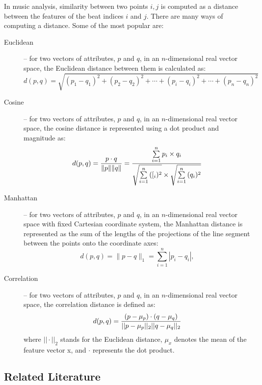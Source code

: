 In music analysis, similarity between two points $i, j$ is computed as a distance between the features of the beat indices $i$ and $j$. There are many ways of computing a distance. Some of the most popular are:
\begin{description}
\item[Euclidean] --  for two vectors of attributes, $p$ and $q$, in an $n$-dimensional real vector space, the Euclidean distance between them is calculated as:
\begin{equation}
d(p, q) = \sqrt{(p_1- q_1)^2 + (p_2 - q_2)^2+\cdots+(p_i - q_i)^2+\cdots+(p_n - q_n)^2}
\end{equation}
\item[Cosine] --  for two vectors of attributes, $p$ and $q$, in an $n$-dimensional real vector space, the cosine distance is represented using a dot product and magnitude as:
\begin{equation}
d(p, q) = {p \cdot q \over \|p\| \|q\|} = \frac{ \sum\limits_{i=1}^{n}{p_i \times q_i} }{ \sqrt{\sum\limits_{i=1}^{n}{([_i)^2}} \times \sqrt{\sum\limits_{i=1}^{n}{(q_i)^2}} }
\end{equation}
\item[Manhattan] --  for two vectors of attributes, $p$ and $q$, in an $n$-dimensional real vector space with fixed Cartesian coordinate system, the Manhattan distance is represented as the sum of the lengths of the projections of the line segment between the points onto the coordinate axes:
\begin{equation}
d(p, q) = \|p - q\|_1 = \sum_{i=1}^n |p_i-q_i|,
\end{equation}
\item[Correlation] --  for two vectors of attributes, $p$ and $q$, in an $n$-dimensional real vector space, the correlation distance is defined as:
\begin{equation}
d(p, q) =  {(p - \mu _{p}) \cdot (q - \mu _{q}) \over ||p -\mu _{p} ||_{2} ||q - \mu _{q}||_{2}}
\end{equation}
where $|| \cdot ||_{2}$ stands for the Euclidean distance, $\mu _{x}$ denotes the mean of the feature vector x, and $\cdot$ represents the dot product.
\end{description}

\vspace{10pt}


\vspace{10pt}

\subsection{Related Literature}

